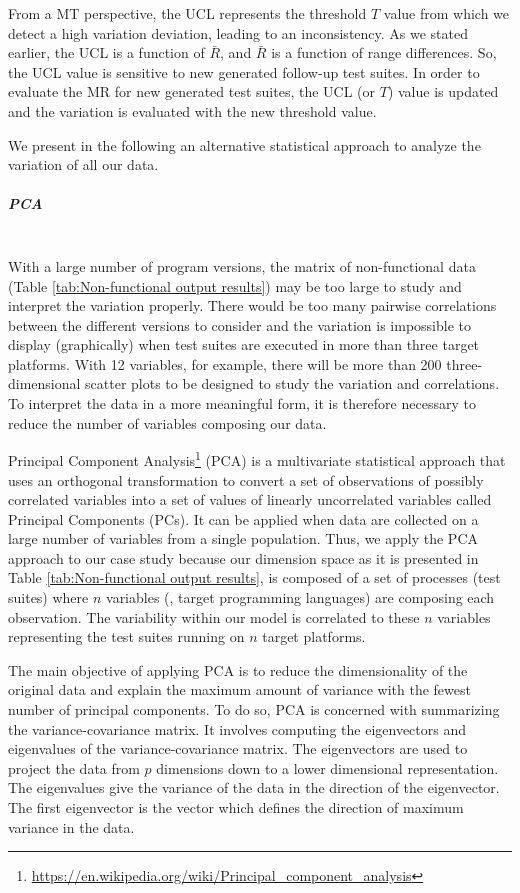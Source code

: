From a MT perspective, the UCL represents the threshold $T$ value from which we detect a high variation deviation, leading to an inconsistency. As we stated earlier, the UCL is a function of $\bar{R}$, and $\bar{R}$ is a function of range differences. So, the UCL value is sensitive to new generated follow-up test suites. In order to evaluate the MR for new generated test suites, the UCL (or $T$) value is updated and the variation is evaluated with the new threshold value. 

We present in the following an alternative statistical approach to analyze the variation of all our data.


\subparagraph{PCA}~\\
With a large number of program versions, the matrix of non-functional data (Table \ref{tab:Non-functional output results}) may be too large to study and interpret the variation properly. There would be too many pairwise correlations between the different versions to consider and the variation is impossible to display (graphically) when test suites are executed in more than three target platforms.
With 12 variables, for example, there will be more than 200 three-dimensional scatter plots to be designed to study the variation and correlations.
To interpret the data in a more meaningful form, it is therefore necessary to reduce the number of variables composing our data.

Principal Component Analysis\footnote{\url{https://en.wikipedia.org/wiki/Principal_component_analysis}} (PCA) is a multivariate statistical approach that uses an orthogonal transformation to convert a set of observations of possibly correlated variables into a set of values of linearly uncorrelated variables called Principal Components (PCs). It can be applied when data are collected on a large number of variables from a single population. Thus, we apply the PCA approach to our case study because our dimension space as it is presented in Table \ref{tab:Non-functional output results}, is composed of a set of processes (test suites) where $n$ variables (\eg, target programming languages) are composing each observation. The variability within our model is correlated to these $n$ variables representing the test suites running on $n$ target platforms. 

The main objective of applying PCA is to reduce the dimensionality of the original data and explain the maximum amount of variance with the fewest number of principal components. To do so, PCA is concerned with summarizing the variance-covariance matrix. It involves computing the eigenvectors and eigenvalues of the variance-covariance matrix. The eigenvectors are used to project the data from $p$ dimensions down to a lower dimensional representation. The eigenvalues give the variance of the data in the direction of the eigenvector. The first eigenvector is the vector which defines the direction of maximum variance in the data.

